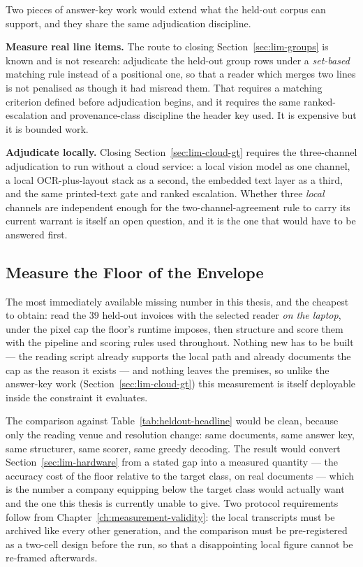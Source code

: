 Two pieces of answer-key work would extend what the held-out corpus can support, and they
share the same adjudication discipline.

\textbf{Measure real line items.} The route to closing Section~\ref{sec:lim-groups} is known
and is not research: adjudicate the held-out group rows under a \emph{set-based} matching
rule instead of a positional one, so that a reader which merges two lines is not penalised
as though it had misread them. That requires a matching criterion defined before
adjudication begins, and it requires the same ranked-escalation and provenance-class
discipline the header key used. It is expensive but it is bounded work.

\textbf{Adjudicate locally.} Closing Section~\ref{sec:lim-cloud-gt} requires the three-channel
adjudication to run without a cloud
service: a local vision model as one channel, a local \ac{OCR}-plus-layout stack as a second, the
embedded text layer as a third, and the same printed-text gate and ranked escalation. Whether
three \emph{local} channels are independent enough for the two-channel-agreement rule to carry
its current warrant is itself an open question, and it is the one that would have to be answered
first.

\subsection{Measure the Floor of the Envelope}
\label{sec:fw-envelope}

The most immediately available missing number in this thesis, and the cheapest to obtain: read
the 39 held-out invoices with the selected reader \emph{on the laptop}, under the pixel cap the
floor's runtime imposes, then structure and score them with the pipeline and scoring rules used
throughout. Nothing new has to be built --- the reading script already supports the local path
and already documents the cap as the reason it exists --- and nothing leaves the premises, so
unlike the answer-key work (Section~\ref{sec:lim-cloud-gt}) this measurement is itself deployable
inside the constraint it evaluates.

The comparison against Table~\ref{tab:heldout-headline} would be clean, because only the
reading venue and resolution change: same documents, same answer key, same structurer, same
scorer, same greedy decoding. The result would convert Section~\ref{sec:lim-hardware} from a stated
gap into a measured quantity --- the accuracy cost of the floor relative to the target class,
on real documents --- which is the number a company equipping below the target class would
actually want and the one this thesis is currently unable to give. Two protocol requirements follow from
Chapter~\ref{ch:measurement-validity}: the local transcripts must be archived like every other
generation, and the comparison must be pre-registered as a two-cell design before the run, so
that a disappointing local figure cannot be re-framed afterwards.

